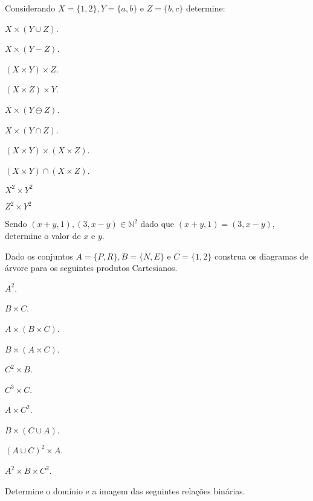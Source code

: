 \begin{questao}\label{prob:Relacoes2}
	Considerando $X = \{1, 2\}, Y = \{a, b\}$ e $Z = \{b, c\}$ determine:
\end{questao}

\begin{exerList}
	\item $X  \times (Y \cup Z)$.
	\item $X  \times (Y - Z)$.
	\item $(X \times Y) \times Z$.
	\item $(X \times Z) \times Y$.
	\item $X  \times (Y \ominus Z)$.
	\item $X  \times (Y \cap Z)$.
	\item $(X \times Y) \times (X \times Z)$.
	\item $(X \times Y) \cap (X \times Z)$.
	\item $X^2 \times Y^2$
	\item $Z^2 \times Y^2$
\end{exerList}

\begin{questao}\label{prob:Relacoes3}
	Sendo $(x + y, 1), (3, x - y) \in \mathbb{N}^2$ dado que $(x + y, 1) = (3, x - y)$, determine o valor de $x$ e $y$.
\end{questao}

\begin{questao}\label{prob:Relacoes4}
	Dado os conjuntos $A = \{P, R\}, B = \{N, E\}$ e $C = \{1, 2\}$ construa os diagramas de árvore para os seguintes produtos Cartesianos.
\end{questao}

\begin{exerList}
	\item $A^2$.
	\item $B \times C$.
	\item $A \times (B \times C)$.
	\item $B \times (A \times C)$.
	\item $C^2 \times B$.
	\item $C^3 \times C$.
	\item $A \times C^2$.
	\item $B \times (C \cup A)$.
	\item $(A \cup C)^2 \times A$.
	\item $A^2 \times B \times C^2$.
\end{exerList}

\begin{questao}\label{prob:Relacoes5}
	Determine o domínio e a imagem das seguintes relações binárias.
\end{questao}


